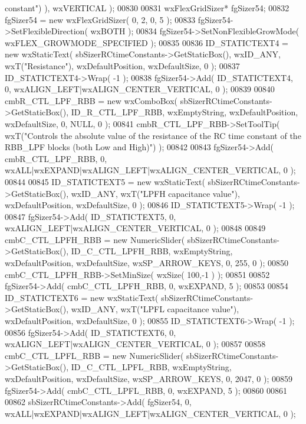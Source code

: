 \begin{DoxyCode}
{       constant"}) ), wxVERTICAL );
00830     
00831     wxFlexGridSizer* fgSizer54;
00832     fgSizer54 = \textcolor{keyword}{new} wxFlexGridSizer( 0, 2, 0, 5 );
00833     fgSizer54->SetFlexibleDirection( wxBOTH );
00834     fgSizer54->SetNonFlexibleGrowMode( wxFLEX\_GROWMODE\_SPECIFIED );
00835     
00836     ID_STATICTEXT4 = \textcolor{keyword}{new} wxStaticText( sbSizerRCtimeConstants->GetStaticBox(), wxID\_ANY, wxT(\textcolor{stringliteral}{"Resistance"}),
       wxDefaultPosition, wxDefaultSize, 0 );
00837     ID_STATICTEXT4->Wrap( -1 );
00838     fgSizer54->Add( ID_STATICTEXT4, 0, wxALIGN\_LEFT|wxALIGN\_CENTER\_VERTICAL, 0 );
00839     
00840     cmbR_CTL_LPF_RBB = \textcolor{keyword}{new} wxComboBox( sbSizerRCtimeConstants->GetStaticBox(), 
      ID_R_CTL_LPF_RBB, wxEmptyString, wxDefaultPosition, wxDefaultSize, 0, NULL, 0 ); 
00841     cmbR_CTL_LPF_RBB->SetToolTip( wxT(\textcolor{stringliteral}{"Controls the absolute value of the resistance of the RC time
       constant of the RBB\_LPF blocks (both Low and High)"}) );
00842     
00843     fgSizer54->Add( cmbR_CTL_LPF_RBB, 0, wxALL|wxEXPAND|wxALIGN\_LEFT|wxALIGN\_CENTER\_VERTICAL, 0 );
00844     
00845     ID_STATICTEXT5 = \textcolor{keyword}{new} wxStaticText( sbSizerRCtimeConstants->GetStaticBox(), wxID\_ANY, wxT(\textcolor{stringliteral}{"LPFH
       capacitance value"}), wxDefaultPosition, wxDefaultSize, 0 );
00846     ID_STATICTEXT5->Wrap( -1 );
00847     fgSizer54->Add( ID_STATICTEXT5, 0, wxALIGN\_LEFT|wxALIGN\_CENTER\_VERTICAL, 0 );
00848     
00849     cmbC_CTL_LPFH_RBB = \textcolor{keyword}{new} NumericSlider( sbSizerRCtimeConstants->GetStaticBox(), 
      ID_C_CTL_LPFH_RBB, wxEmptyString, wxDefaultPosition, wxDefaultSize, wxSP\_ARROW\_KEYS, 0, 255, 0 );
00850     cmbC_CTL_LPFH_RBB->SetMinSize( wxSize( 100,-1 ) );
00851     
00852     fgSizer54->Add( cmbC_CTL_LPFH_RBB, 0, wxEXPAND, 5 );
00853     
00854     ID_STATICTEXT6 = \textcolor{keyword}{new} wxStaticText( sbSizerRCtimeConstants->GetStaticBox(), wxID\_ANY, wxT(\textcolor{stringliteral}{"LPFL
       capacitance value"}), wxDefaultPosition, wxDefaultSize, 0 );
00855     ID_STATICTEXT6->Wrap( -1 );
00856     fgSizer54->Add( ID_STATICTEXT6, 0, wxALIGN\_LEFT|wxALIGN\_CENTER\_VERTICAL, 0 );
00857     
00858     cmbC_CTL_LPFL_RBB = \textcolor{keyword}{new} NumericSlider( sbSizerRCtimeConstants->GetStaticBox(), 
      ID_C_CTL_LPFL_RBB, wxEmptyString, wxDefaultPosition, wxDefaultSize, wxSP\_ARROW\_KEYS, 0, 2047, 0 );
00859     fgSizer54->Add( cmbC_CTL_LPFL_RBB, 0, wxEXPAND, 5 );
00860     
00861     
00862     sbSizerRCtimeConstants->Add( fgSizer54, 0, wxALL|wxEXPAND|wxALIGN\_LEFT|wxALIGN\_CENTER\_VERTICAL, 0 );

\end{DoxyCode}
